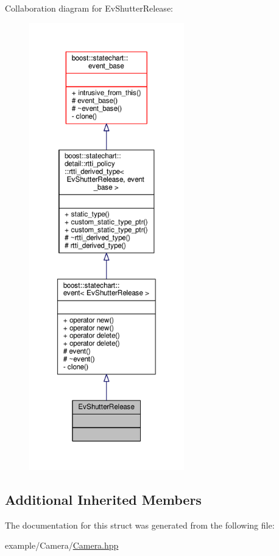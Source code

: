 Collaboration diagram for Ev\+Shutter\+Release\+:
\nopagebreak
\begin{figure}[H]
\begin{center}
\leavevmode
\includegraphics[height=550pt]{struct_ev_shutter_release__coll__graph}
\end{center}
\end{figure}
\subsection*{Additional Inherited Members}


The documentation for this struct was generated from the following file\+:\begin{DoxyCompactItemize}
\item 
example/\+Camera/\mbox{\hyperlink{_camera_8hpp}{Camera.\+hpp}}\end{DoxyCompactItemize}
